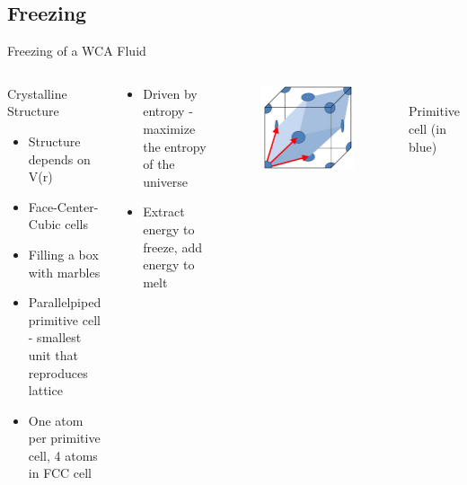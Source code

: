 \documentclass{beamer}
\begin{document}
\subsection*{Freezing}
\begin{frame}{Freezing of a WCA Fluid}
	\begin{columns}[t]
	    \vspace{-1em}
		\begin{block}{Crystalline Structure}
			\begin{itemize}
			    \item Structure depends on V(r)
				\item Face-Center-Cubic cells 
				\item Filling a box with marbles
				\item Parallelpiped primitive cell - 
				smallest unit that reproduces lattice
				\item One atom per primitive cell, 4 atoms in FCC cell
			\end{itemize}
		\end{block}
        \vspace{-2em}
        \begin{block}{}
            \begin{itemize}
			    \item Driven by entropy - maximize the entropy of the universe
				\item Extract energy to freeze, add energy to melt  
			\end{itemize}   
	    \end{block}
        \begin{figure}
            \centering
            \includegraphics[width=0.4\columnwidth]{PrimitiveCellLightBlue.png}
          \end{figure}
          $~~~~~~~$Primitive cell (in blue)
	\end{columns}	
\end{frame}
\end{document}
